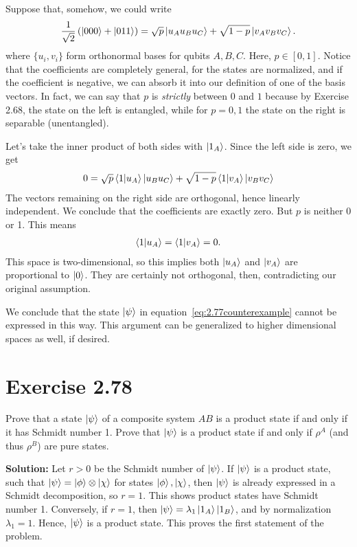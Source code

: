 \documentclass{book}
\begin{document}
    Suppose that, somehow, we could write
    \begin{align}
        \frac{1}{\sqrt{2}} \left(\ket{000} + \ket{011}\right) = \sqrt{p} \ket{u_A u_B u_C} + \sqrt{1-p} \ket{v_A v_B v_C}.
    \end{align}
    where $\{u_i, v_i\}$ form orthonormal bases for qubits $A, B, C$. Here, $p \in [0,1]$. Notice that the coefficients are completely general, for the states are normalized, and if the coefficient is negative, we can absorb it into our definition of one of the basis vectors. In fact, we can say that $p$ is \emph{strictly} between $0$ and $1$ because by Exercise 2.68, the state on the left is entangled, while for $p = 0,1$ the state on the right is separable (unentangled). 

    Let's take the inner product of both sides with $\ket{1_A}$. Since the left side is zero, we get
    \begin{align}
        0 = \sqrt{p} \bra{1}\ket{u_A} \ket{u_B u_C} + \sqrt{1-p} \bra{1}\ket{v_A} \ket{v_B v_C}
    \end{align}
    The vectors remaining on the right side are orthogonal, hence linearly independent. We conclude that the coefficients are exactly zero. But $p$ is neither 0 or 1. This means
    \begin{align}
        \bra{1}\ket{u_A} = \bra{1}\ket{v_A} = 0.
    \end{align}
    This space is two-dimensional, so this implies both $\ket{u_A}$ and $\ket{v_A}$ are proportional to $\ket{0}$. They are certainly not orthogonal, then, contradicting our original assumption.

    We conclude that the state $\ket{\psi}$ in equation~\eqref{eq:2.77counterexample} cannot be expressed in this way. This argument can be generalized to higher dimensional spaces as well, if desired.

\section*{Exercise 2.78}
    Prove that a state $\ket{\psi}$ of a composite system $AB$ is a product state if and only if it has Schmidt number 1. Prove that $\ket{\psi}$ is a product state if and only if $\rho^A$ (and thus $\rho^B$) are pure states.

    \textbf{Solution:} Let $r > 0$ be the Schmidt number of $\ket{\psi}$. If $\ket{\psi}$ is a product state, such that $\ket{\psi} = \ket{\phi}\otimes \ket{\chi}$ for states $\ket{\phi}, \ket{\chi}$, then $\ket{\psi}$ is already expressed in a Schmidt decomposition, so $r = 1$. This shows product states have Schmidt number 1. Conversely, if $r = 1$, then $\ket{\psi} = \lambda_1 \ket{1_A}\ket{1_B}$, and by normalization $\lambda_1 = 1$. Hence, $\ket{\psi}$ is a product state. This proves the first statement of the problem.
\end{document}
